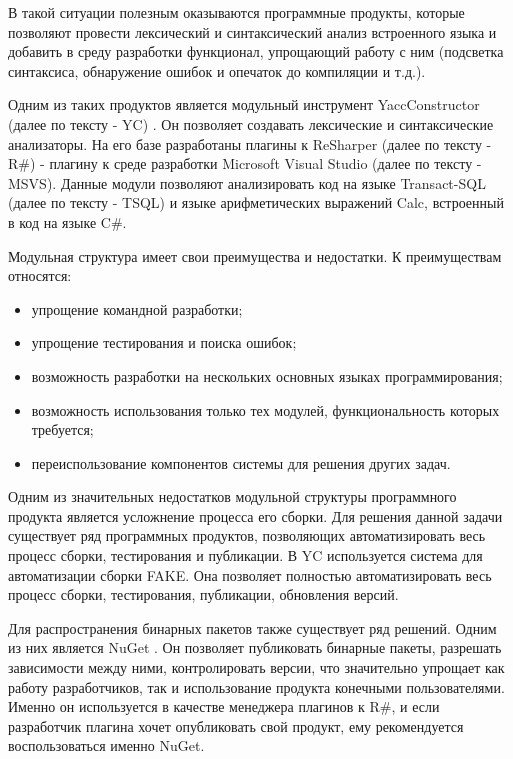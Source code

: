 \documentclass{matmex-diploma-custom}
\begin{document}
В такой ситуации полезным оказываются программные продукты, которые позволяют провести лексический и синтаксический анализ встроенного языка и добавить в среду разработки функционал, упрощающий работу с ним (подсветка синтаксиса, обнаружение ошибок и опечаток до компиляции и т.д.).

Одним из таких продуктов является модульный инструмент YaccConstructor (далее по тексту - YC) \cite{yc}. Он позволяет создавать лексические и синтаксические анализаторы. На его базе разработаны плагины к ReSharper (далее по тексту - R\#) \cite{resharper} - плагину к среде разработки Microsoft Visual Studio (далее по тексту - MSVS). Данные модули позволяют анализировать код на языке Transact-SQL (далее по тексту - TSQL) и языке арифметических выражений Calc, встроенный в код на языке C\#.

Модульная структура имеет свои преимущества и недостатки. К преимуществам относятся:

\begin{itemize}
\item
упрощение командной разработки;
\item
упрощение тестирования и поиска ошибок;
\item
возможность разработки на нескольких основных языках программирования;
\item
возможность использования только тех модулей, функциональность которых требуется;
\item
переиспользование компонентов системы для решения других задач.
\end{itemize}

Одним из значительных недостатков модульной структуры программного продукта является усложнение процесса его сборки. Для решения данной задачи существует ряд программных продуктов, позволяющих автоматизировать весь процесс сборки, тестирования и публикации. В YC используется система для автоматизации сборки FAKE. Она позволяет полностью автоматизировать весь процесс сборки, тестирования, публикации, обновления версий.

Для распространения бинарных пакетов также существует ряд решений. Одним из них является NuGet \cite{nuget}. Он позволяет публиковать бинарные пакеты, разрешать зависимости между ними, контролировать версии, что значительно упрощает как работу разработчиков, так и использование продукта конечными пользователями. Именно он используется в качестве менеджера плагинов к R\#, и если разработчик плагина хочет опубликовать свой продукт, ему рекомендуется воспользоваться именно NuGet.
\end{document}
